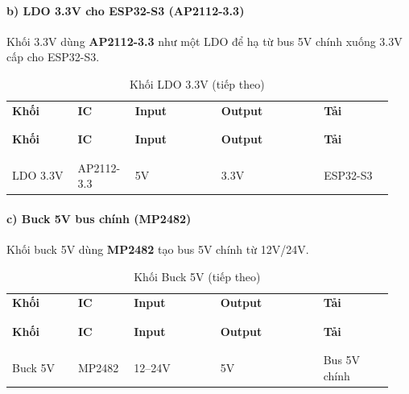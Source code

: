 \documentclass[a4paper]{extarticle}
\newcommand{\thesissettableid}[2]{%
  \renewcommand{\thetable}{#1}%
  \renewcommand{\theHtable}{#2}%
}
\begin{document}
\paragraph{b) LDO 3.3V cho ESP32-S3 (AP2112-3.3)}\label{b-buck-33v-cho-esp32-s3-xl1509-33e}

Khối 3.3V dùng \textbf{AP2112-3.3} như một LDO để hạ từ bus 5V chính xuống
3.3V cấp cho ESP32-S3.


{\thesissettableid{4.2}{tab-ch4-khoi-buck-3-3v}
\def\LTcaptype{table}
\begin{longtable}{|L{0.168\linewidth}|L{0.132\linewidth}|L{0.218\linewidth}|L{0.250\linewidth}|L{0.176\linewidth}|}
\caption{Khối LDO 3.3V}\label{tab:ch4-khoi-buck-3-3v}\\
\hline \textbf{Khối} & \textbf{IC} & \textbf{Input} & \textbf{Output} & \textbf{Tải} \\
\\\hline
\endfirsthead
\caption[]{Khối LDO 3.3V (tiếp theo)}\\
\hline \textbf{Khối} & \textbf{IC} & \textbf{Input} & \textbf{Output} & \textbf{Tải} \\
\\\hline
\endhead
\\\hline
\endfoot
\endlastfoot
LDO 3.3V & AP2112-3.3 & 5V & 3.3V & ESP32-S3 \\\hline
\end{longtable}
}


\paragraph{c) Buck 5V bus chính
(MP2482)}\label{c-buck-5v-bus-chuxednh-mp2482}

Khối buck 5V dùng \textbf{MP2482} tạo bus 5V chính từ 12V/24V.


{\thesissettableid{4.3}{tab-ch4-khoi-buck-5v}
\def\LTcaptype{table}
\begin{longtable}{|L{0.168\linewidth}|L{0.132\linewidth}|L{0.218\linewidth}|L{0.250\linewidth}|L{0.176\linewidth}|}
\caption{Khối Buck 5V}\label{tab:ch4-khoi-buck-5v}\\
\hline \textbf{Khối} & \textbf{IC} & \textbf{Input} & \textbf{Output} & \textbf{Tải} \\
\\\hline
\endfirsthead
\caption[]{Khối Buck 5V (tiếp theo)}\\
\hline \textbf{Khối} & \textbf{IC} & \textbf{Input} & \textbf{Output} & \textbf{Tải} \\
\\\hline
\endhead
\\\hline
\endfoot
\endlastfoot
Buck 5V & MP2482 & 12--24V & 5V & Bus 5V chính \\\hline
\end{longtable}
}
\end{document}
